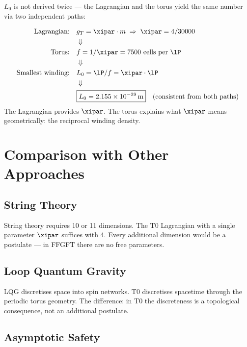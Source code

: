 $L_0$ is not derived twice — the Lagrangian and the torus yield the same number via two independent paths:

\begin{keyresult}
\begin{align}
	\text{Lagrangian:} \quad & g_T = \xipar \cdot m \;\Rightarrow\; \xipar = 4/30000 \notag \\
	& \Downarrow \notag \\
	\text{Torus:} \quad & f = 1/\xipar = 7500 \text{ cells per } \lP \notag \\
	& \Downarrow \notag \\
	\text{Smallest winding:} \quad & L_0 = \lP / f = \xipar \cdot \lP \notag \\
	& \Downarrow \notag \\
	& \boxed{L_0 = 2{.}155 \times 10^{-39}\,\text{m}} \quad \text{(consistent from both paths)}
\end{align}
The Lagrangian provides $\xipar$. The torus explains what $\xipar$ means geometrically: the reciprocal winding density.
\end{keyresult}

\section{Comparison with Other Approaches}

\subsection{String Theory}

String theory requires 10 or 11 dimensions. The T0 Lagrangian with a single parameter $\xipar$ suffices with 4. Every additional dimension would be a postulate — in FFGFT there are no free parameters.

\subsection{Loop Quantum Gravity}

LQG discretises space into spin networks. T0 discretises spacetime through the periodic torus geometry. The difference: in T0 the discreteness is a topological consequence, not an additional postulate.

\subsection{Asymptotic Safety}

